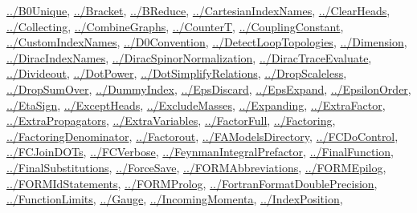 \documentclass[../FeynCalcManual.tex]{subfiles}
\begin{document}
\begin{itemize}
  \hyperlink{../b0unique}{../B0Unique},
  \hyperlink{../bracket}{../Bracket},
  \hyperlink{../breduce}{../BReduce},
  \hyperlink{../cartesianindexnames}{../CartesianIndexNames},
  \hyperlink{../clearheads}{../ClearHeads},
  \hyperlink{../collecting}{../Collecting},
  \hyperlink{../combinegraphs}{../CombineGraphs},
  \hyperlink{../countert}{../CounterT},
  \hyperlink{../couplingconstant}{../CouplingConstant},
  \hyperlink{../customindexnames}{../CustomIndexNames},
  \hyperlink{../d0convention}{../D0Convention},
  \hyperlink{../detectlooptopologies}{../DetectLoopTopologies},
  \hyperlink{../dimension}{../Dimension},
  \hyperlink{../diracindexnames}{../DiracIndexNames},
  \hyperlink{../diracspinornormalization}{../DiracSpinorNormalization},
  \hyperlink{../diractraceevaluate}{../DiracTraceEvaluate},
  \hyperlink{../divideout}{../Divideout},
  \hyperlink{../dotpower}{../DotPower},
  \hyperlink{../dotsimplifyrelations}{../DotSimplifyRelations},
  \hyperlink{../dropscaleless}{../DropScaleless},
  \hyperlink{../dropsumover}{../DropSumOver},
  \hyperlink{../dummyindex}{../DummyIndex},
  \hyperlink{../epsdiscard}{../EpsDiscard},
  \hyperlink{../epsexpand}{../EpsExpand},
  \hyperlink{../epsilonorder}{../EpsilonOrder},
  \hyperlink{../etasign}{../EtaSign},
  \hyperlink{../exceptheads}{../ExceptHeads},
  \hyperlink{../excludemasses}{../ExcludeMasses},
  \hyperlink{../expanding}{../Expanding},
  \hyperlink{../extrafactor}{../ExtraFactor},
  \hyperlink{../extrapropagators}{../ExtraPropagators},
  \hyperlink{../extravariables}{../ExtraVariables},
  \hyperlink{../factorfull}{../FactorFull},
  \hyperlink{../factoring}{../Factoring},
  \hyperlink{../factoringdenominator}{../FactoringDenominator},
  \hyperlink{../factorout}{../Factorout},
  \hyperlink{../famodelsdirectory}{../FAModelsDirectory},
  \hyperlink{../fcdocontrol}{../FCDoControl},
  \hyperlink{../fcjoindots}{../FCJoinDOTs},
  \hyperlink{../fcverbose}{../FCVerbose},
  \hyperlink{../feynmanintegralprefactor}{../FeynmanIntegralPrefactor},
  \hyperlink{../finalfunction}{../FinalFunction},
  \hyperlink{../finalsubstitutions}{../FinalSubstitutions},
  \hyperlink{../forcesave}{../ForceSave},
  \hyperlink{../formabbreviations}{../FORMAbbreviations},
  \hyperlink{../formepilog}{../FORMEpilog},
  \hyperlink{../formidstatements}{../FORMIdStatements},
  \hyperlink{../formprolog}{../FORMProlog},
  \hyperlink{../fortranformatdoubleprecision}{../FortranFormatDoublePrecision},
  \hyperlink{../functionlimits}{../FunctionLimits},
  \hyperlink{../gauge}{../Gauge},
  \hyperlink{../incomingmomenta}{../IncomingMomenta},
  \hyperlink{../indexposition}{../IndexPosition},

\end{itemize}
\end{document}
